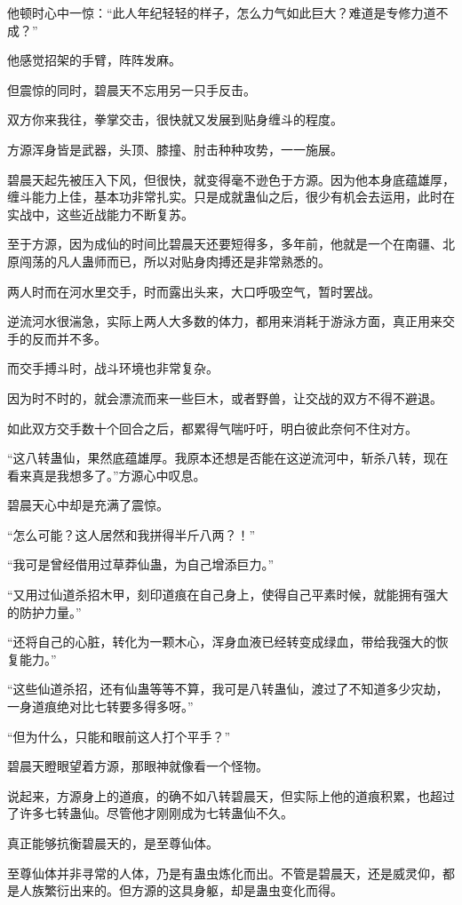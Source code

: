 \begin{this_body}
他顿时心中一惊：“此人年纪轻轻的样子，怎么力气如此巨大？难道是专修力道不成？”

他感觉招架的手臂，阵阵发麻。

但震惊的同时，碧晨天不忘用另一只手反击。

双方你来我往，拳掌交击，很快就又发展到贴身缠斗的程度。

方源浑身皆是武器，头顶、膝撞、肘击种种攻势，一一施展。

碧晨天起先被压入下风，但很快，就变得毫不逊色于方源。因为他本身底蕴雄厚，缠斗能力上佳，基本功非常扎实。只是成就蛊仙之后，很少有机会去运用，此时在实战中，这些近战能力不断复苏。

至于方源，因为成仙的时间比碧晨天还要短得多，多年前，他就是一个在南疆、北原闯荡的凡人蛊师而已，所以对贴身肉搏还是非常熟悉的。

两人时而在河水里交手，时而露出头来，大口呼吸空气，暂时罢战。

逆流河水很湍急，实际上两人大多数的体力，都用来消耗于游泳方面，真正用来交手的反而并不多。

而交手搏斗时，战斗环境也非常复杂。

因为时不时的，就会漂流而来一些巨木，或者野兽，让交战的双方不得不避退。

如此双方交手数十个回合之后，都累得气喘吁吁，明白彼此奈何不住对方。

“这八转蛊仙，果然底蕴雄厚。我原本还想是否能在这逆流河中，斩杀八转，现在看来真是我想多了。”方源心中叹息。

碧晨天心中却是充满了震惊。

“怎么可能？这人居然和我拼得半斤八两？！”

“我可是曾经借用过草莽仙蛊，为自己增添巨力。”

“又用过仙道杀招木甲，刻印道痕在自己身上，使得自己平素时候，就能拥有强大的防护力量。”

“还将自己的心脏，转化为一颗木心，浑身血液已经转变成绿血，带给我强大的恢复能力。”

“这些仙道杀招，还有仙蛊等等不算，我可是八转蛊仙，渡过了不知道多少灾劫，一身道痕绝对比七转要多得多呀。”

“但为什么，只能和眼前这人打个平手？”

碧晨天瞪眼望着方源，那眼神就像看一个怪物。

说起来，方源身上的道痕，的确不如八转碧晨天，但实际上他的道痕积累，也超过了许多七转蛊仙。尽管他才刚刚成为七转蛊仙不久。

真正能够抗衡碧晨天的，是至尊仙体。

至尊仙体并非寻常的人体，乃是有蛊虫炼化而出。不管是碧晨天，还是威灵仰，都是人族繁衍出来的。但方源的这具身躯，却是蛊虫变化而得。


\end{this_body}
